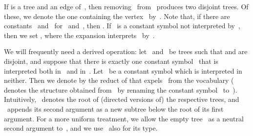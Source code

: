\documentclass{LMCS}
\begin{document}
If  is a tree and  an edge of~,
then removing~ from~ produces two disjoint trees.
Of these, we denote the one containing the vertex~ by~.
Note that, if there are constants ~and~ for ~and~,
then .
If ~is a constant symbol not interpreted by~,
then we set ,
where the expansion interprets~ by~.

We will frequently need a derived operation\?:
let ~and~ be trees
such that  and  are disjoint, and
suppose that there is exactly one constant symbol~
that is interpreted both in ~and in~.
Let ~be a constant symbol which is interpreted in neither.
Then we denote by 
the reduct of 
that expels~ from the vocabulary ( denotes
the structure obtained from~ by renaming the constant symbol~
to~).
Intuitively,
~denotes the root of (directed versions of) the respective trees,
and ~appends its second argument as a new subtree
below the root of its first argument.
For a more uniform treatment,
we allow the empty tree~
as a neutral second argument to~, and
we use~ also for its type.
\end{document}
